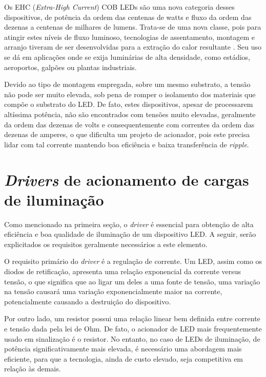 \documentclass[
        12pt,
        openany, %
        oneside, %
        a4paper,			
        english,			
        brazil
        ]{abntbibufjf}
\begin{document}
Os EHC (\textit{Extra-High Current}) COB LEDs são uma nova categoria desses dispositivos, de potência da ordem das centenas de watts e fluxo da ordem das dezenas a centenas de milhares de lumens. Trata-se de uma nova classe, pois para atingir estes níveis de fluxo luminoso, tecnologias de assentamento, montagem e arranjo tiveram de ser desenvolvidas para a extração do calor resultante \cite{denis}. Seu uso se dá em aplicações onde se exija luminárias de alta densidade, como estádios, aeroportos, galpões ou plantas industriais.

Devido ao tipo de montagem empregada, sobre um mesmo substrato, a tensão não pode ser muito elevada, sob pena de romper o isolamento dos materiais que compõe o substrato do LED. De fato, estes dispositivos, apesar de processarem altíssima potência, não são encontrados com tensões muito elevadas, geralmente da ordem das dezenas de volts e consequentemente com correntes da ordem das dezenas de amperes, o que dificulta um projeto de acionador, pois este precisa lidar com tal corrente mantendo boa eficiência e baixa transferência de \textit{ripple}.


\section{\textit{Drivers} de acionamento de cargas de iluminação}

Como mencionado na primeira seção, o \textit{driver} é essencial para obtenção de alta eficiência e boa qualidade de iluminação de um dispositivo LED. A seguir, serão explicitados os requisitos geralmente necessários a este elemento.

O requisito primário do \textit{driver} é a regulação de corrente. Um LED, assim como os diodos de retificação, apresenta uma relação exponencial da corrente versus tensão, o que significa que ao ligar um deles a uma fonte de tensão, uma variação na tensão causará uma variação exponencialmente maior na corrente, potencialmente causando a destruição do dispositivo.

Por outro lado, um resistor possui uma relação linear bem definida entre corrente e tensão dada pela lei de Ohm. De fato, o acionador de LED mais frequentemente usado em sinalização é o resistor. No entanto, no caso de LEDs de iluminação, de potência significativamente mais elevada, é necessário uma abordagem mais eficiente, para que a tecnologia, ainda de custo elevado, seja competitiva em relação às demais.
\end{document}
